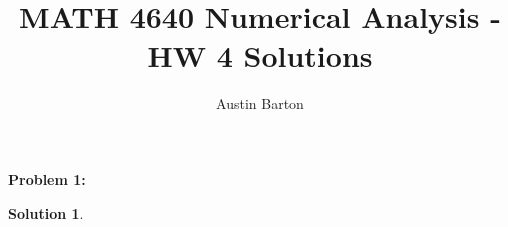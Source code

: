 \documentclass[12pt, letterpaper]{article}
\title{MATH 4640 Numerical Analysis - HW 4 Solutions}
\author{Austin Barton}
\theoremstyle{nonumberplain}
\newtheorem{sol}{Solution}
\begin{document}
\maketitle

\vspace{2em}

\hspace{18pt}\textbf{Problem 1:} \medskip
\begin{sol}
    
\end{sol}
\end{document}
